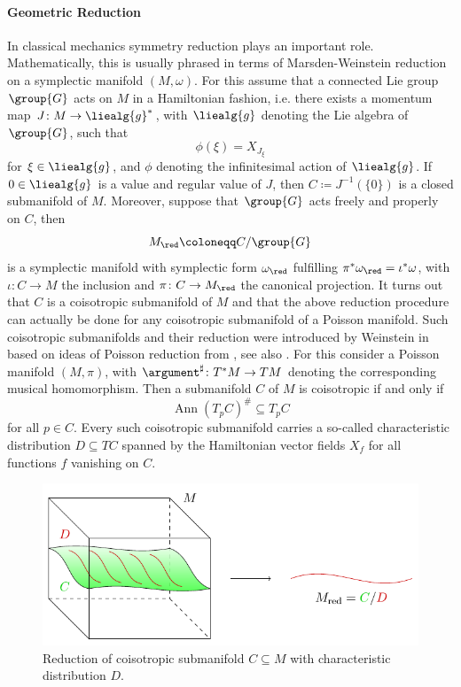 \documentclass{memoir}
\newcommand{\Ann}{\operatorname{Ann}}
\begin{document}
\paragraph{Geometric Reduction}
In classical mechanics symmetry reduction plays an important role.
Mathematically, this is usually phrased in terms of Marsden-Weinstein reduction \cite{marsden.weinstein:1974a} on a symplectic manifold $(M,\omega)$.
For this assume that a connected Lie group $\group{G}$ acts on $M$ in a Hamiltonian fashion, i.e.
there exists a momentum map $J \colon M \to \liealg{g}^*$, with $\liealg{g}$ denoting the Lie algebra of $\group{G}$,
such that
\begin{equation}
	\phi(\xi) = X_{J_\xi}
\end{equation}
for $\xi \in \liealg{g}$, and $\phi$ denoting the infinitesimal action of $\liealg{g}$.
If $0 \in \liealg{g}$ is a value and regular value of $J$, then $C \coloneqq J^{-1}(\{0\})$
is a closed submanifold of $M$.
Moreover, suppose that $\group{G}$ acts freely and properly on $C$, then
\begin{equation}
	M_\red \coloneqq C / \group{G}
\end{equation}
is a symplectic manifold with symplectic form $\omega_\red$ fulfilling $\pi^*\omega_\red = \iota^*\omega$,
with $\iota \colon C \to M$ the inclusion and $\pi \colon C \to M_\red$ the canonical projection.
It turns out that $C$ is a coisotropic submanifold of $M$ and that the above reduction procedure can actually be done for any coisotropic submanifold of a Poisson manifold.
Such coisotropic submanifolds and their reduction were introduced by Weinstein in \cite{weinstein:1988a} based on ideas
of Poisson reduction from \cite{marsden.ratiu:1086a}, see also \cite{stasheff:1997a}.
For this consider a Poisson manifold $(M,\pi)$, with $\argument^\sharp \colon T^*M \to TM$ denoting the corresponding musical homomorphism.
Then a submanifold $C$ of $M$ is coisotropic if and only if 
\begin{equation}
	\Ann(T_pC)^\# \subseteq T_pC
\end{equation}
for all $p \in C$.
Every such coisotropic submanifold carries a so-called characteristic distribution $D \subseteq TC$ spanned by the 
Hamiltonian vector fields $X_f$ for all functions $f$ vanishing on $C$.
\begin{figure}[t]
	\centering
	\includegraphics{constraintmanifold-Dippel.pdf}
	\caption{Reduction of coisotropic submanifold $C \subseteq M$ with characteristic distribution $D$.}
	\label{fig:ConstraintManifold}
\end{figure}
\end{document}
